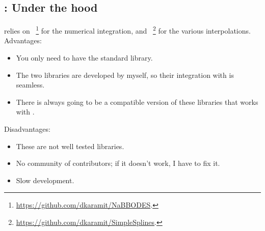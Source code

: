 \documentclass[10pt,utf8,compress,xcolor=dvipsnames]{beamer}
\begin{document}
\subsection{\mimes: Under the hood}
\begin{frame}{\insertsubsectionhead}
	\mimes relies on ~\footnote{\fontF \href{https://github.com/dkaramit/NaBBODES}{https://github.com/dkaramit/NaBBODES}.} for the numerical integration, and ~\footnote{\fontF \href{https://github.com/dkaramit/SimpleSplines}{https://github.com/dkaramit/SimpleSplines}.} for the various interpolations.\\[0.3cm] 
	
	Advantages:
	\begin{itemize}
		\item You only need to have the standard \CPP library.
		\item The two libraries are developed by myself, so their integration with \mimes is seamless.
		\item There is always going to be a compatible version of these libraries that works with \mimes.\\[0.3cm]
	\end{itemize}	
	
	Disadvantages:
	\begin{itemize}
		\item These are not well tested libraries.
		\item No community of contributors; if it doesn't work, I have to fix it.
		\item Slow development.
	\end{itemize}	

\end{frame}
\end{document}
